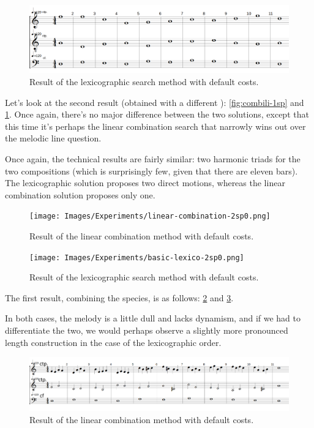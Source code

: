 \begin{figure}[h]
    \centering
    \includegraphics[width=1\textwidth]{Images/Experiments/basic-lexico-1sp.png}
    \caption{Result of the lexicographic search method with default costs.}
    \label{fig:lexico-1sp}
\end{figure}

Let's look at the second result (obtained with a different \cfs): \ref{fig:combili-1sp} and \ref{fig:lexico-1sp}. Once again, there's no major difference between the two solutions, except that this time it's perhaps the linear combination search that narrowly wins out over the melodic line question.

Once again, the technical results are fairly similar: two harmonic triads for the two compositions (which is surprisingly few, given that there are eleven bars). The lexicographic solution proposes two direct motions, whereas the linear combination solution proposes only one. 

\begin{figure}[h]
    \centering
    \texttt{[image: Images/Experiments/linear-combination-2sp0.png]}
    \caption{Result of the linear combination method with default costs.}
    \label{fig:combili-2sp0}
\end{figure}

\begin{figure}[h]
    \centering
    \texttt{[image: Images/Experiments/basic-lexico-2sp0.png]}
    \caption{Result of the lexicographic search method with default costs.}
    \label{fig:lexico-2sp0}
\end{figure}


The first result, combining the species, is as follows: \ref{fig:combili-2sp0} and \ref{fig:lexico-2sp0}.

In both cases, the melody is a little dull and lacks dynamism, and if we had to differentiate the two, we would perhaps observe a slightly more pronounced length construction in the case of the lexicographic order.

\begin{figure}[h]
    \centering
    \includegraphics[width=1\textwidth]{Images/Experiments/linear-combination-2sp.png}
    \caption{Result of the linear combination method with default costs.}
    \label{fig:combili-2sp}
\end{figure}

